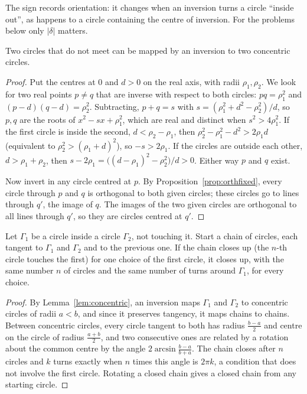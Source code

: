 The sign records orientation: it changes when an inversion turns a circle ``inside out'', as happens to a circle containing the centre of
inversion. For the problems below only $|\delta|$ matters.

\begin{lemma}\label{lem:concentric}
Two circles that do not meet can be mapped by an inversion to two concentric circles.
\end{lemma}
\begin{proof}
Put the centres at $0$ and $d>0$ on the real axis, with radii $\rho_1,\rho_2$. We look for two real points $p\ne q$ that are inverse with respect
to both circles: $pq=\rho_1^2$ and $(p-d)(q-d)=\rho_2^2$. Subtracting, $p+q=s$ with $s=(\rho_1^2+d^2-\rho_2^2)/d$, so $p,q$ are the roots of
$x^2-sx+\rho_1^2$, which are real and distinct when $s^2>4\rho_1^2$. If the first circle is inside the second, $d<\rho_2-\rho_1$, then
$\rho_2^2-\rho_1^2-d^2>2\rho_1d$ (equivalent to $\rho_2^2>(\rho_1+d)^2$), so $-s>2\rho_1$. If the circles are outside each other,
$d>\rho_1+\rho_2$, then $s-2\rho_1=\bigl((d-\rho_1)^2-\rho_2^2\bigr)/d>0$. Either way $p$ and $q$ exist.

Now invert in any circle centred at $p$. By Proposition~\ref{prop:orthfixed}, every circle through $p$ and $q$ is orthogonal to both given
circles; these circles go to lines through $q'$, the image of $q$. The images of the two given circles are orthogonal to all lines through
$q'$, so they are circles centred at $q'$.
\end{proof}

\begin{theorem}\label{thm:steiner}
Let $\Gamma_1$ be a circle inside a circle $\Gamma_2$, not touching it. Start a chain of circles, each tangent to $\Gamma_1$ and $\Gamma_2$ and to the
previous one. If the chain closes up (the $n$-th circle touches the first) for one choice of the first circle, it closes up, with the same
number $n$ of circles and the same number of turns around $\Gamma_1$, for every choice.
\end{theorem}
\begin{proof}
By Lemma~\ref{lem:concentric}, an inversion maps $\Gamma_1$ and $\Gamma_2$ to concentric circles of radii $a<b$, and since it preserves tangency, it
maps chains to chains. Between concentric circles, every circle tangent to both has radius $\frac{b-a}2$ and centre on the circle of radius
$\frac{a+b}2$, and two consecutive ones are related by a rotation about the common centre by the angle $2\arcsin\frac{b-a}{b+a}$. The chain
closes after $n$ circles and $k$ turns exactly when $n$ times this angle is $2\pi k$, a condition that does not involve the first circle. Rotating
a closed chain gives a closed chain from any starting circle.
\end{proof}

